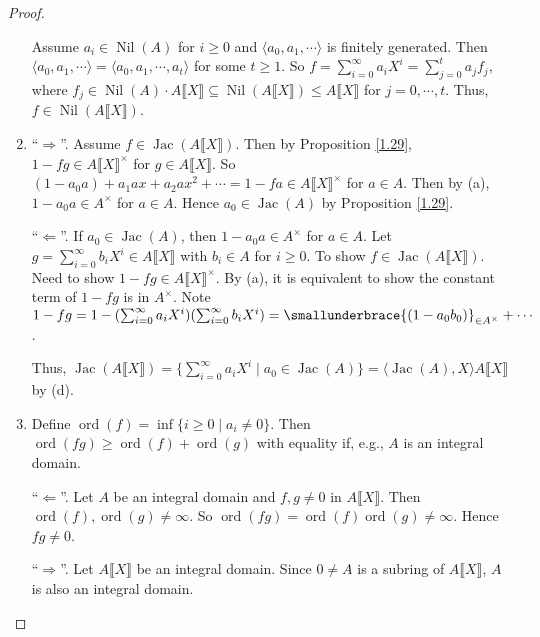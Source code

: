 \begin{proof}
\begin{enumerate}
            Assume $a_i \in \operatorname{Nil}(A)$ for $i \geq 0$ and $\langle a_0,a_1,\cdots \rangle$ is finitely generated. Then $\langle a_0,a_1,\cdots \rangle = \langle a_0,a_1,\cdots,a_t \rangle$ for some $t \geq 1$. So $f = \sum_{i=0}^\infty a_iX^i = \sum_{j=0}^t a_jf_j$, where $f_j \in \operatorname{Nil}(A) \cdot A \llbracket X \rrbracket \subseteq \operatorname{Nil}(A\llbracket X \rrbracket) \leq A\llbracket X \rrbracket$ for $j = 0,\cdots,t$. Thus, $f \in \operatorname{Nil}(A\llbracket X \rrbracket)$. 
        \item  ``$\Rightarrow$''. Assume $f \in \operatorname{Jac}(A\llbracket X \rrbracket)$. Then by Proposition \ref{1.29}, $1-fg \in A\llbracket X \rrbracket^\times$ for $g \in A\llbracket X \rrbracket$. So $(1-a_0a) + a_1ax + a_2ax^2 + \cdots = 1-fa \in A\llbracket X \rrbracket^\times$ for $a \in A$. Then by (a), $1-a_0a \in A^\times$ for $a \in A$. Hence $a_0 \in \operatorname{Jac}(A)$ by Proposition \ref{1.29}. \par 
            ``$\Leftarrow$''. If $a_0 \in \operatorname{Jac}(A)$, then $1-a_0a \in A^\times$ for $a \in A$. Let $g = \sum_{i=0}^\infty b_iX^i \in A\llbracket X \rrbracket$ with $b_i \in A$ for $i \geq 0$. To show $f \in \operatorname{Jac}(A\llbracket X \rrbracket)$. Need to show $1-fg \in A\llbracket X \rrbracket^\times$. By (a), it is equivalent to show the constant term of $1-fg$ is in $A^\times$. Note $1-fg = 1-(\sum_{i=0}^\infty a_iX^i)(\sum_{i=0}^\infty b_iX^i) = \smallunderbrace{(1-a_0b_0)}_{\in A^\times} + \cdots$. \par 
            Thus, $\operatorname{Jac}(A\llbracket X \rrbracket) = \{\sum_{i=0}^\infty a_iX^i \mid a_0 \in \operatorname{Jac}(A)\} = \langle \operatorname{Jac}(A),X \rangle A \llbracket X \rrbracket$ by (d). 
        \item 
            Define $\operatorname{ord}(f) = \inf\{i \geq 0 \mid a_i \neq 0\}$. Then $\operatorname{ord}(fg) \geq \operatorname{ord}(f) + \operatorname{ord}(g)$ with equality if, e.g., $A$ is an integral domain. \par 
            ``$\Leftarrow$''. Let $A$ be an integral domain and $f,g \neq 0$ in $A\llbracket X \rrbracket$. Then $\operatorname{ord}(f),\operatorname{ord}(g) \neq \infty$. So $\operatorname{ord}(fg) = \operatorname{ord}(f)\operatorname{ord}(g) \neq \infty$. Hence $fg \neq 0$. \par
            ``$\Rightarrow$''. Let $A\llbracket X \rrbracket$ be an integral domain. Since $0 \neq A$ is a subring of $A\llbracket X \rrbracket$, $A$ is also an integral domain. \par

\end{enumerate}
\end{proof}
